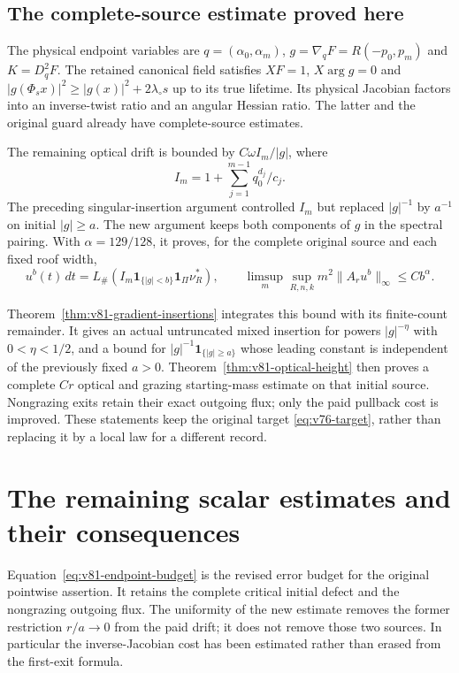 \documentclass[11pt,reqno]{amsart}
\numberwithin{equation}{section}
\theoremstyle{definition}
\theoremstyle{remark}\newtheorem{remark}[theorem]{Remark}
\newcommand{\one}{\mathbf1}\newcommand{\dd}{\,\mathrm d}
\begin{document}
\subsection{The complete-source estimate proved here}
The physical endpoint variables are
$q=(\alpha_0,\alpha_m)$, $g=\nabla_qF=R(-p_0,p_m)$ and
$K=D_q^2F$. The retained canonical field satisfies $XF=1$,
$X\arg g=0$ and
$|g(\Phi_sx)|^2\ge |g(x)|^2+2\lambda_\circ s$ up to its true
lifetime. Its physical Jacobian factors into an inverse-twist ratio
and an angular Hessian ratio. The latter and the original guard
already have complete-source estimates.

The remaining optical drift is bounded by
$C\omega I_m/|g|$, where
\[
 I_m=1+\sum_{j=1}^{m-1}q_0^{d_j}/c_j.
\]
The preceding singular-insertion argument controlled $I_m$ but
replaced $|g|^{-1}$ by $a^{-1}$ on initial $|g|\ge a$.
The new argument keeps both components of $g$ in the spectral
pairing. With $\alpha=129/128$, it proves, for the complete original
source and each fixed roof width,
\[
 u^b(t)\,dt=L_\#(I_m\one_{\{|g|<b\}}\one_\Pi\nu_R^*),\qquad
 \limsup_m\sup_{R,n,k}m^2\|A_ru^b\|_\infty\le Cb^\alpha.
\]

Theorem~\ref{thm:v81-gradient-insertions} integrates this bound with
its finite-count remainder. It gives an actual untruncated mixed
insertion for powers $|g|^{-\eta}$ with $0<\eta<1/2$, and a bound
for $|g|^{-1}\one_{\{|g|\ge a\}}$ whose leading constant is
independent of the previously fixed $a>0$.
Theorem~\ref{thm:v81-optical-height} then proves a complete
$Cr$ optical and grazing starting-mass estimate on that initial
source. Nongrazing exits retain their exact outgoing flux; only
the paid pullback cost is improved. These statements keep the
original target \eqref{eq:v76-target}, rather than replacing it by
a local law for a different record.













\section{The remaining scalar estimates and their consequences}
Equation~\eqref{eq:v81-endpoint-budget} is the revised error budget
for the original pointwise assertion. It retains the complete
critical initial defect and the nongrazing outgoing flux. The
uniformity of the new estimate removes the former restriction
$r/a\to0$ from the paid drift; it does not remove those two sources.
In particular the inverse-Jacobian cost has been estimated rather
than erased from the first-exit formula.
\end{document}
